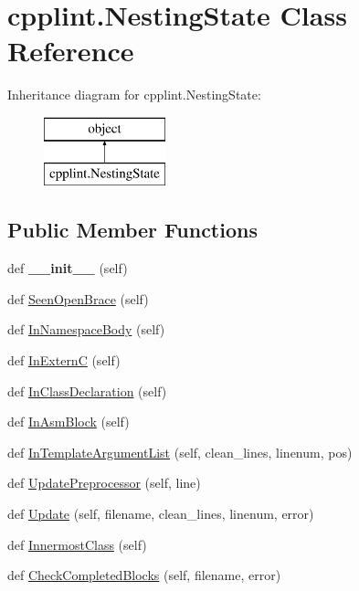 \hypertarget{classcpplint_1_1NestingState}{}\section{cpplint.\+Nesting\+State Class Reference}
\label{classcpplint_1_1NestingState}
Inheritance diagram for cpplint.\+Nesting\+State\+:\begin{figure}[H]
\begin{center}
\leavevmode
\includegraphics[height=2.000000cm]{classcpplint_1_1NestingState}
\end{center}
\end{figure}
\subsection*{Public Member Functions}
\begin{DoxyCompactItemize}
\item 
def {\bfseries \+\_\+\+\_\+init\+\_\+\+\_\+} (self)\hypertarget{classcpplint_1_1NestingState_a47e1ad559b9c7304f53d19ef6ebedab4}{}\label{classcpplint_1_1NestingState_a47e1ad559b9c7304f53d19ef6ebedab4}

\item 
def \hyperlink{classcpplint_1_1NestingState_a15abc0719a22ca8fbb7a8235f0e22b3e}{Seen\+Open\+Brace} (self)
\item 
def \hyperlink{classcpplint_1_1NestingState_a1a06f50d53cfe11b1f78d45b531e0c32}{In\+Namespace\+Body} (self)
\item 
def \hyperlink{classcpplint_1_1NestingState_a67aa1907d42b8408c227ff18537071c7}{In\+ExternC} (self)
\item 
def \hyperlink{classcpplint_1_1NestingState_a8e111c25149c41bd8927606244965b3c}{In\+Class\+Declaration} (self)
\item 
def \hyperlink{classcpplint_1_1NestingState_aa35a529052e4863a477eae649ce778d2}{In\+Asm\+Block} (self)
\item 
def \hyperlink{classcpplint_1_1NestingState_a8f4e9ba1aaa0459de2bedd966e7a2b54}{In\+Template\+Argument\+List} (self, clean\+\_\+lines, linenum, pos)
\item 
def \hyperlink{classcpplint_1_1NestingState_ac3d509c536af445e8ab6b17b067b53f1}{Update\+Preprocessor} (self, line)
\item 
def \hyperlink{classcpplint_1_1NestingState_a3adead8c1575b98ace5c5230f3772c1e}{Update} (self, filename, clean\+\_\+lines, linenum, error)
\item 
def \hyperlink{classcpplint_1_1NestingState_a4141768e75b16698463670caaa587120}{Innermost\+Class} (self)
\item 
def \hyperlink{classcpplint_1_1NestingState_a7bde5ab65152b4073763b1bd17cba567}{Check\+Completed\+Blocks} (self, filename, error)
\end{DoxyCompactItemize}
